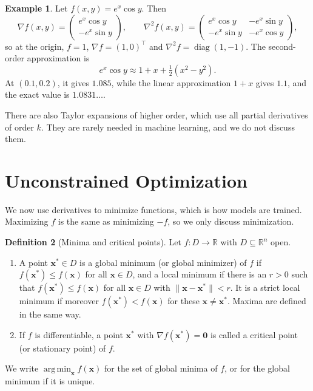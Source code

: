 \documentclass[11pt]{article}
\newcommand{\norm}[1]{\lVert #1 \rVert}
\theoremstyle{definition}
\newtheorem{definition}{Definition}[section]
\newtheorem{example}[definition]{Example}
\theoremstyle{plain}
\theoremstyle{remark}
\DeclareMathOperator{\diag}{diag}
\DeclareMathOperator*{\argmin}{arg\,min}
\begin{document}
\begin{example}\label{ex:taylor2}
    Let $f(x, y) = e^x \cos y$. Then
    \[\nabla f(x, y) = \begin{pmatrix} e^x\cos y \\ -e^x\sin y \end{pmatrix}, \qquad \nabla^2 f(x, y) = \begin{pmatrix} e^x\cos y & -e^x\sin y \\ -e^x\sin y & -e^x\cos y \end{pmatrix},\]
    so at the origin, $f = 1$, $\nabla f = (1, 0)^\top$ and $\nabla^2 f = \diag(1, -1)$. The second-order approximation is
    \[e^x \cos y \approx 1 + x + \tfrac{1}{2}(x^2 - y^2).\]
    At $(0.1, 0.2)$, it gives $1.085$, while the linear approximation $1 + x$ gives $1.1$, and the exact value is $1.0831\ldots$.
\end{example}

There are also Taylor expansions of higher order, which use all partial derivatives of order $k$. They are rarely needed in machine learning, and we do not discuss them.

\section{Unconstrained Optimization}\label{sec:optimization}

We now use derivatives to minimize functions, which is how models are trained. Maximizing $f$ is the same as minimizing $-f$, so we only discuss minimization.

\begin{definition}[Minima and critical points]\label{def:minimum}
    Let $f: D \to \mathbb{R}$ with $D \subseteq \mathbb{R}^n$ open.
    \begin{enumerate}
        \item A point $\mathbf{x}^* \in D$ is a global minimum (or global minimizer) of $f$ if $f(\mathbf{x}^*) \leq f(\mathbf{x})$ for all $\mathbf{x} \in D$, and a local minimum if there is an $r > 0$ such that $f(\mathbf{x}^*) \leq f(\mathbf{x})$ for all $\mathbf{x} \in D$ with $\norm{\mathbf{x} - \mathbf{x}^*} < r$. It is a strict local minimum if moreover $f(\mathbf{x}^*) < f(\mathbf{x})$ for these $\mathbf{x} \neq \mathbf{x}^*$. Maxima are defined in the same way.
        \item If $f$ is differentiable, a point $\mathbf{x}^*$ with $\nabla f(\mathbf{x}^*) = \mathbf{0}$ is called a critical point (or stationary point) of $f$.
    \end{enumerate}
    We write $\argmin_{\mathbf{x}} f(\mathbf{x})$ for the set of global minima of $f$, or for the global minimum if it is unique.
\end{definition}
\end{document}
